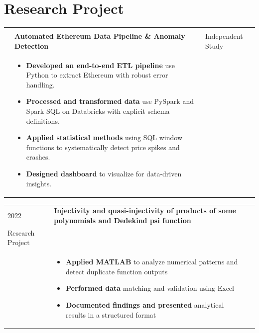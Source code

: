 \documentclass[11pt,a4paper]{article}
\begin{document}
\section*{Research Project}
\begin{tabularx}{\textwidth}{p{2.5cm} X >{\raggedleft\arraybackslash}p{4cm}}
\begin{tabular}[t]{@{}l@{}}2026 \\ \end{tabular} & 
\small\textbf{Automated Ethereum Data Pipeline \& Anomaly Detection} & \small{Independent Study} \\
&
    \begin{itemize}
        \item \textbf{Developed an end-to-end ETL pipeline} use Python to extract Ethereum with robust error handling.
        \item \textbf{Processed and transformed data} use PySpark and Spark SQL on Databricks with explicit schema definitions.
        \item \textbf{Applied statistical methods} using SQL window functions to systematically detect price spikes and crashes.
        \item \textbf{Designed dashboard} to visualize for data-driven insights.
    \end{itemize}
\end{tabularx}

\begin{tabularx}{\textwidth}{p{2.5cm} X >{\raggedleft\arraybackslash}p{4cm}}
2022 &
\small\textbf{Injectivity and quasi-injectivity of products of some polynomials and Dedekind psi function} & 
\begin{tabular}[t]{@{}r@{}}\small{Undergraduate} \\ \small{Research Project}\end{tabular} \\
&
    \begin{itemize}
        \item \textbf{Applied MATLAB} to analyze numerical patterns and detect duplicate function outputs
        \item \textbf{Performed data} matching and validation using Excel
        \item \textbf{Documented findings and presented} analytical results in a structured format
    \end{itemize}
\end{tabularx}



\end{document}
